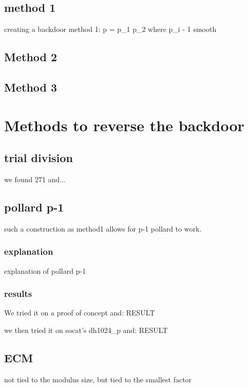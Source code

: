 \documentclass[a4paper,11pt]{article}
\begin{document}
\subsection{method 1}

creating a backdoor method 1: p = p_1 p_2 where p_i - 1 smooth

\subsection{Method 2}

\subsection{Method 3}

\section{Methods to reverse the backdoor}

\subsection{trial division}

we found 271 and...

\subsection{pollard p-1}

such a construction as method1 allows for p-1 pollard to work.

\subsubsection{explanation}

explanation of pollard p-1

\subsubsection{results}

We tried it on a proof of concept and: RESULT

we then tried it on socat's dh1024_p and: RESULT

\subsection{ECM}

not tied to the modulus size, but tied to the smallest factor
\end{document}
